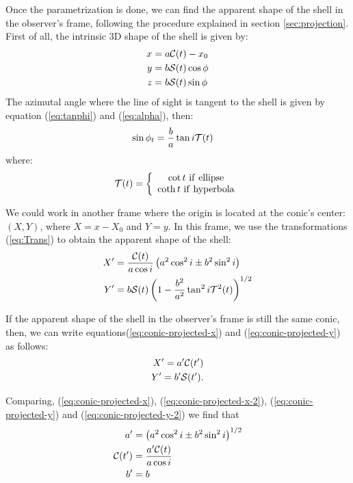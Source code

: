 Once the parametrization is done, we can find the apparent shape of
the shell in the observer's frame, following the procedure explained
in section \ref{sec:projection}.  First of all, the intrinsic 3D shape of the shell is given by:
\begin{align}
x &= a\mathcal{C}(t)-x_0 \\ 
y &= b\mathcal{S}(t)\cos\phi \\
z &=  b\mathcal{S}(t)\sin\phi
\end{align}
The azimutal angle where the line of sight is tangent to the shell is given by equation (\ref{eq:tanphi}) and (\ref{eq:alpha}), then:
\begin{align}
\sin\phi_t &= \frac{b}{a}\tan i\mathcal{T}(t) 
\end{align}
where:
\begin{align}
\mathcal{T}(t) = \left\lbrace \begin{array}{c}
\cot t ~\mathrm{if~ellipse} \\
\coth t ~\mathrm{if~hyperbola}
\end{array}\right.
\end{align}

We could work in another frame where the origin is located at the conic's center: $(X,Y)$, where $X=x-X_0$ and $Y=y$.
In this frame, we use the transformations (\ref{eq:Trans})  to obtain the apparent shape of the shell:
\begin{align}
X' &= \frac{\mathcal{C}(t)}{a\cos i}\left(a^2\cos^2 i \pm b^2\sin^2 i\right)  \label{eq:conic-projected-x}\\
Y' &= b\mathcal{S}(t)\left(1-\frac{b^2}{a^2}\tan^2 i\mathcal{T}^2(t)\right)^{1/2}
\label{eq:conic-projected-y}
\end{align}


If the apparent shape of the shell in the observer's frame is still the same conic, then, we
can write equations(\ref{eq:conic-projected-x}) and (\ref{eq:conic-projected-y}) as follows:
\begin{align}
X' = a'\mathcal{C}( t') \label{eq:conic-projected-x-2} \\
Y' = b'\mathcal{S} (t') \label{eq:conic-projected-y-2} . 
\end{align}

Comparing, (\ref{eq:conic-projected-x}), (\ref{eq:conic-projected-x-2}), (\ref{eq:conic-projected-y}) and (\ref{eq:conic-projected-y-2}) we find that
\begin{align}
a' &= \left(a^2\cos^2 i \pm b^2\sin^2 i\right)^{1/2} \\
\mathcal{C}(t') &= \frac{a'\mathcal{C}(t)}{a\cos i} \\
b' &= b \label{eq:b-prime}
\end{align} 

